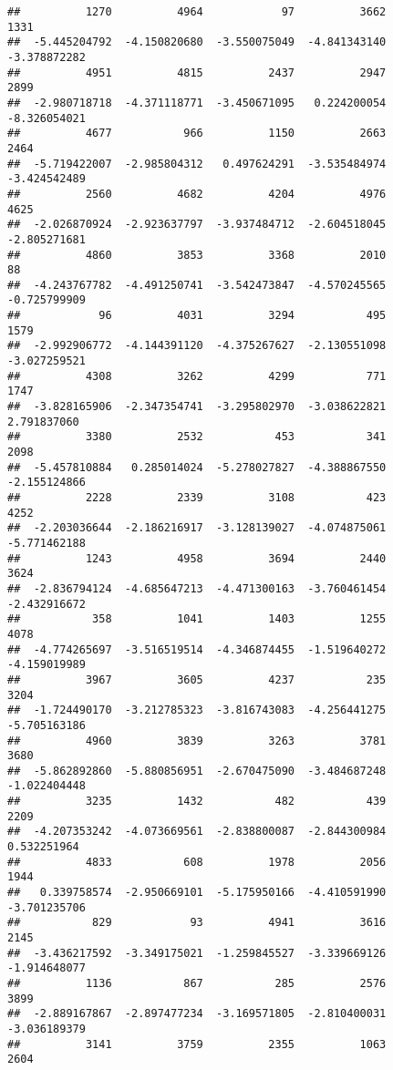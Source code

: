 \documentclass[
]{article}
\begin{document}
\begin{verbatim}
##          1270          4964            97          3662          1331 
##  -5.445204792  -4.150820680  -3.550075049  -4.841343140  -3.378872282 
##          4951          4815          2437          2947          2899 
##  -2.980718718  -4.371118771  -3.450671095   0.224200054  -8.326054021 
##          4677           966          1150          2663          2464 
##  -5.719422007  -2.985804312   0.497624291  -3.535484974  -3.424542489 
##          2560          4682          4204          4976          4625 
##  -2.026870924  -2.923637797  -3.937484712  -2.604518045  -2.805271681 
##          4860          3853          3368          2010            88 
##  -4.243767782  -4.491250741  -3.542473847  -4.570245565  -0.725799909 
##            96          4031          3294           495          1579 
##  -2.992906772  -4.144391120  -4.375267627  -2.130551098  -3.027259521 
##          4308          3262          4299           771          1747 
##  -3.828165906  -2.347354741  -3.295802970  -3.038622821   2.791837060 
##          3380          2532           453           341          2098 
##  -5.457810884   0.285014024  -5.278027827  -4.388867550  -2.155124866 
##          2228          2339          3108           423          4252 
##  -2.203036644  -2.186216917  -3.128139027  -4.074875061  -5.771462188 
##          1243          4958          3694          2440          3624 
##  -2.836794124  -4.685647213  -4.471300163  -3.760461454  -2.432916672 
##           358          1041          1403          1255          4078 
##  -4.774265697  -3.516519514  -4.346874455  -1.519640272  -4.159019989 
##          3967          3605          4237           235          3204 
##  -1.724490170  -3.212785323  -3.816743083  -4.256441275  -5.705163186 
##          4960          3839          3263          3781          3680 
##  -5.862892860  -5.880856951  -2.670475090  -3.484687248  -1.022404448 
##          3235          1432           482           439          2209 
##  -4.207353242  -4.073669561  -2.838800087  -2.844300984   0.532251964 
##          4833           608          1978          2056          1944 
##   0.339758574  -2.950669101  -5.175950166  -4.410591990  -3.701235706 
##           829            93          4941          3616          2145 
##  -3.436217592  -3.349175021  -1.259845527  -3.339669126  -1.914648077 
##          1136           867           285          2576          3899 
##  -2.889167867  -2.897477234  -3.169571805  -2.810400031  -3.036189379 
##          3141          3759          2355          1063          2604 

\end{verbatim}
\end{document}
